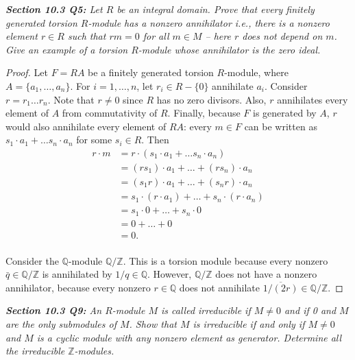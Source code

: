 \documentclass{article}
\begin{document}
\it \textbf{Section 10.3 Q5:} Let $R$ be an integral domain. Prove that
  every finitely generated torsion $R$-module has a nonzero annihilator
  i.e., there is a nonzero element $r\in R$ such that $rm=0$ for all $m\in
  M$ -- here $r$ does not depend on $m$. Give an example of a torsion
  $R$-module whose annihilator is the zero ideal.

  \begin{proof}
    Let $F=RA$ be a finitely generated torsion $R$-module, where
    $A=\{a_1,\ldots,a_n\}$. For $i=1,\ldots,n$, let $r_i\in R-\{0\}$
    annihilate $a_i$. Consider $r=r_1\ldots r_n$. Note that $r\neq0$ since
    $R$ has no zero divisors. Also, $r$ annihilates every element of $A$
    from commutativity of $R$. Finally, because $F$ is generated by $A$,
    $r$ would also annihilate every element of $RA$: every $m\in F$ can be
    written as $s_1\cdot a_1+\ldots s_n\cdot a_n$ for some $s_i\in R$. Then
    \begin{align*}
      r\cdot m &=r\cdot(s_1\cdot a_1+\ldots s_n\cdot a_n)\\
      &=(rs_1)\cdot a_1 +\ldots +(rs_n)\cdot a_n\\
      &=(s_1r)\cdot a_1 +\ldots +(s_nr)\cdot a_n\\
      &=s_1\cdot(r\cdot a_1) +\ldots +s_n\cdot(r\cdot a_n)\\
      &=s_1\cdot0 +\ldots +s_n\cdot0\\
      &=0 +\ldots +0\\
      &=0.\\
    \end{align*}

    Consider the $\mathbb{Q}$-module $\mathbb{Q}/\mathbb{Z}$. This is a
    torsion module because every nonzero $\bar{q}\in\mathbb{Q}/\mathbb{Z}$
    is annihilated by $1/q\in\mathbb{Q}$. However, $\mathbb{Q}/\mathbb{Z}$
    does not have a nonzero annihilator, because every nonzero
    $r\in\mathbb{Q}$ does not annihilate
    $\overline{1/(2r)}\in\mathbb{Q}/\mathbb{Z}$.
  \end{proof}

\it \textbf{Section 10.3 Q9:} An $R$-module $M$ is called irreducible if
  $M\neq0$ and if 0 and $M$ are the only submodules of $M$. Show that $M$
  is irreducible if and only if $M\neq0$ and $M$ is a cyclic module with
  any nonzero element as generator. Determine all the irreducible
  $\mathbb{Z}$-modules.
\end{document}

